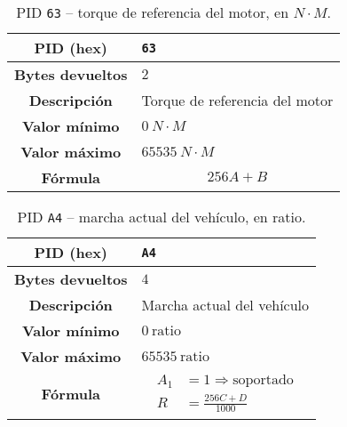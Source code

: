 \begin{table}[H]
  \centering
  \begin{tabularx}{\textwidth}{|c|X|}
    \hline
    \textbf{PID (hex)}       & \texttt{63}                    \\
    \hline
    \textbf{Bytes devueltos} & $2$                            \\
    \hline
    \textbf{Descripción}     & Torque de referencia del motor \\
    \hline
    \textbf{Valor mínimo}    & $0~N \cdot M$                          \\
    \hline
    \textbf{Valor máximo}    & $65535~N \cdot M$                        \\
    \hline
    \textbf{Fórmula}         &                                %
    \begin{equation*}
      256A + B
    \end{equation*}                                 \\
    \hline
  \end{tabularx}
  \caption{\ac{PID} \texttt{63} -- torque de referencia del motor, en $N \cdot M$.}
\end{table}

\begin{table}[H]
  \centering
  \begin{tabularx}{\textwidth}{|c|X|}
    \hline
    \textbf{PID (hex)}       & \texttt{A4}                    \\
    \hline
    \textbf{Bytes devueltos} & $4$                            \\
    \hline
    \textbf{Descripción}     & Marcha actual del vehículo \\
    \hline
    \textbf{Valor mínimo}    & $0~\text{ratio}$                          \\
    \hline
    \textbf{Valor máximo}    & $65535~\text{ratio}$                        \\
    \hline
    \textbf{Fórmula}         &                                %
    \begin{equation*}
      \begin{aligned}
        A_1 &= 1 \Rightarrow \text{soportado} \\
        R &= \frac{256C + D}{1000}
      \end{aligned}
    \end{equation*}                                 \\
    \hline
  \end{tabularx}
  \caption{\ac{PID} \texttt{A4} -- marcha actual del vehículo, en ratio.}
\end{table}

